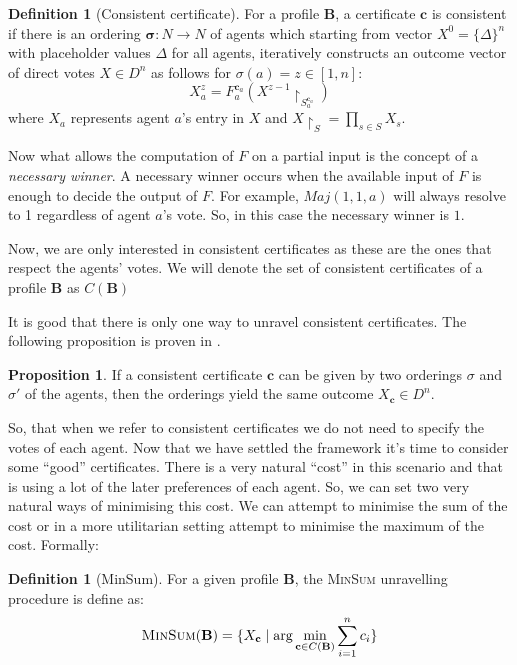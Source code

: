 \documentclass[11pt,a4paper, titlepage]{article}
\theoremstyle{definition}
\newtheorem{definition}[theorem]{Definition}
\newtheorem{proposition}[theorem]{Proposition}
\begin{document}
\begin{definition}[Consistent certificate]
    For a profile $\mathbf{B}$, a certificate $\mathbf{c}$ is consistent if there is an ordering $\mathbf{\sigma} \colon N \longrightarrow N$ of agents which starting from vector $X^0 = \{\Delta\}^n$ with placeholder values $\Delta$ for all agents, iteratively constructs an outcome vector of direct votes $X \in D^n$ as follows for $\sigma(a) = z \in [1,n]$:
    \[
        X^z_a = F^{\mathbf{c}_a}_a(X^{z-1} \restriction_{S^{\mathbf{c}_a}_a} )
    \]
    where $X_a$ represents agent $a$'s entry in $X$ and $X \restriction_S = \prod_{s \in S} X_s$.

\end{definition}
Now what allows the computation of $F$ on a partial input is the concept of a \emph{necessary winner}. A necessary winner occurs when the available input of $F$ is enough to decide  the output of $F$. For example, $\mathit{Maj}(1, 1, a)$ will always resolve to 1 regardless of agent $a$'s vote. So, in this case the necessary winner is $1$.

Now, we are only interested in consistent certificates as these are the ones that respect the agents' votes. We will denote the set of consistent certificates of a profile $\mathbf{B}$ as $C(\mathbf{B})$

It is good that there is only one way to unravel consistent certificates. The following proposition is proven in .

\begin{proposition}
    If a consistent certificate $\mathbf{c}$ can be given by two orderings $\sigma$ and $\sigma'$ of the agents, then the orderings yield the same outcome $X_\mathbf{c} \in D^n$.
\end{proposition}

So, that when we refer to consistent certificates we do not need to specify the votes of each agent. Now that we have settled the framework it's time to consider some ``good'' certificates. There is a very natural ``cost'' in this scenario and that is using a lot of the later preferences of each agent. So, we can set two very natural ways of minimising this cost. We can attempt to minimise the sum of the cost or in a more utilitarian setting attempt to minimise the maximum of the cost. Formally:

\begin{definition}[MinSum]
    For a given profile $\mathbf{B}$, the \textsc{MinSum} unravelling procedure is define as:
    \[
        \textsc{MinSum}(\mathbf{B}) = \{X_{\mathbf{c}} \mid \mathrm{arg} \min_{\mathbf{c} \in C(\mathbf{B})} \sum_{i=1}^n c_i \}
    \]
\end{definition}
\end{document}
